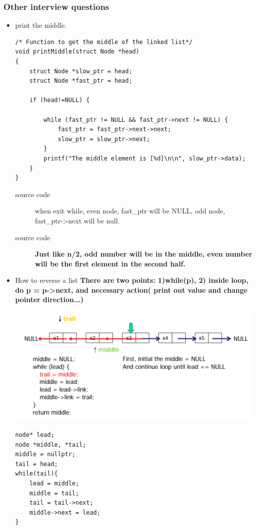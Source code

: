\documentclass[a4paper,11pt,twoside]{book}
\begin{document}
\subsubsection{Other interview questions}
\begin{itemize}
	\item print the middle. 
\begin{lstlisting}[breaklines]
/* Function to get the middle of the linked list*/
void printMiddle(struct Node *head) 
{ 
	struct Node *slow_ptr = head; 
	struct Node *fast_ptr = head; 
	
	if (head!=NULL) {
		 
		while (fast_ptr != NULL && fast_ptr->next != NULL) { 
			fast_ptr = fast_ptr->next->next; 
			slow_ptr = slow_ptr->next; 
		} 
		printf("The middle element is [%d]\n\n", slow_ptr->data); 
	} 
} 
\end{lstlisting}
\begin{description}
	\item[source code] when exit while, even node, fast\_ptr will be NULL, odd node, fast\_ptr->next will be null.
	\item[source code] \textbf{Just like n/2, odd number will be in the middle, even number will be the first element in the second half.}
\end{description}
	
\item How to reverse a list \textbf{ There are two points: 1)while(p),  2) inside loop, do p = p->next, and necessary action( print out value and change pointer direction...)}
\newline

\includegraphics[scale=0.65]{pics/reverse.png} \newline

\begin{lstlisting}[breaklines]
node* lead; 
node *middle, *tail;
middle = nullptr;
tail = head;
while(tail){
	lead = middle;
	middle = tail;
	tail = tail->next;
	middle->next = lead;
}


\end{lstlisting}
\end{itemize}
\end{document}
